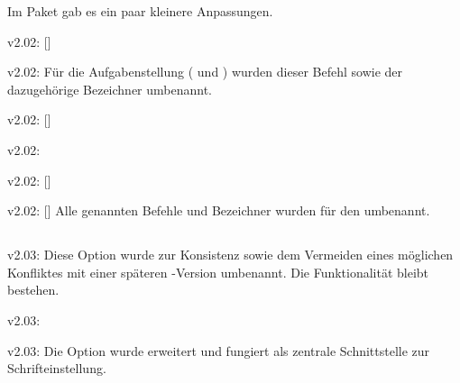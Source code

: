 %
\begin{Entity}{}
Im Paket  gab es ein paar kleinere Anpassungen.
\begin{Cessation}{v2.02:}{%
  []%
}
\begin{Cessation}{v2.02:}{}
\printobsoletelist%
%
Für die Aufgabenstellung ( und ) wurden 
dieser Befehl sowie der dazugehörige Bezeichner umbenannt.
\end{Cessation}
\end{Cessation}

\begin{Cessation}{v2.02:}{%
  []%
}
\begin{Cessation}{v2.02:}{}
\begin{Cessation}{v2.02:}{%
  []%
}
\begin{Cessation}{v2.02:}{%
  []%
}
\printobsoletelist%
%
Alle genannten Befehle und Bezeichner wurden für den \noticename{} umbenannt.
\end{Cessation}
\end{Cessation}
\end{Cessation}
\end{Cessation}
\end{Entity}


\subsection{}
\begin{Cessation}{v2.03:}{}
\printobsoletelist%
%
Diese Option wurde zur Konsistenz sowie dem Vermeiden eines möglichen 
Konfliktes mit einer späteren \KOMAScript-Version umbenannt. Die Funktionalität 
bleibt bestehen.
\end{Cessation}

\begin{Cessation}{v2.03:}{}
\begin{Cessation}{v2.03:}{}
\printobsoletelist%
%
Die Option  wurde erweitert und fungiert als zentrale 
Schnittstelle zur Schrifteinstellung. 
\end{Cessation}
\end{Cessation}

